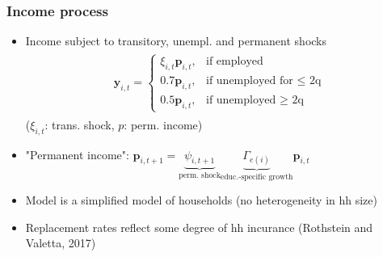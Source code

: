 \documentclass[pdflatex,aspectratio=169]{beamer}
\begin{document}
    \begin{frame}
      \frametitle{ Income process}

      \begin{itemize}[<+->]

      \item Income subject to transitory, unempl. and permanent shocks
        \begin{equation}\begin{gathered}\begin{aligned}
          \mathbf{y}_{i,t} =   \begin{cases}
            \xi_{i,t}\mathbf{p}_{i,t}, & \text{if employed} \\
            0.7 \mathbf{p}_{i,t}, & \text{if unemployed for $\leq$ 2q} \\
            0.5 \mathbf{p}_{i,t}, & \text{if unemployed $\ge$ 2q} 
          \end{cases}
        \end{aligned}\end{gathered}\end{equation}
        ($\xi_{i,t}$: trans.
shock, $p$: perm.
income)
        
      \item "Permanent income":  $\mathbf{p}_{i,t+1} = \underbrace{\psi_{i,t+1}}_{\text{perm.
shock}} \underbrace{\Gamma_{e(i)}}_{\text{educ.-specific growth}}\mathbf{p}_{i,t}$ 


        \pause
        \bigskip
%        

	\item Model is a simplified model of households (no heterogeneity in hh size)
	\item Replacement rates reflect some degree of hh incurance (Rothstein and Valetta, 2017)       
        
      \end{itemize}

    \end{frame}
\end{document}
